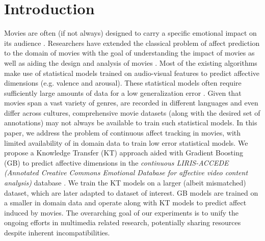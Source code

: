 \documentclass{article}
\begin{document}
\section{Introduction}
\label{sec:intro}
Movies are often (if not always) designed to carry a specific emotional impact on its audience \cite{bartsch2012emotional, canini2009emotional}.
Researchers have extended the classical problem of affect prediction to the domain of movies with the goal of understanding the impact of movies as well as aiding the design and analysis of movies \cite{giannakopoulos2009dimensional, jiang2014predicting}. 
Most of the existing algorithms make use of statistical models trained on audio-visual features to predict affective dimensions (e.g. valence and arousal).  
These statistical models often require sufficiently large amounts of data for a low generalization error \cite{vapnik1998statistical}.
Given that movies span a vast variety of genres, are recorded in different languages and even differ across cultures, comprehensive movie datasets (along with the desired set of annotations) may not always be available to train such statistical models. 
In this paper, we address the problem of continuous affect tracking in movies, with limited availability of in domain data to train low error statistical models. 
We propose a Knowledge Transfer (KT) approach aided with Gradient Boosting (GB) to predict affective dimensions in the {\it continuous LIRIS-ACCEDE (Annotated Creative Commons Emotional Database for affective video content analysis)} database \cite{baveye2015liris}.
We train the KT models on a larger (albeit mismatched) dataset, which are later adapted to dataset of interest. 
GB models are trained on a smaller in domain data and operate along with KT models to predict affect induced by movies.
The overarching goal of our experiments is to unify the ongoing efforts in multimedia related research, potentially sharing resources despite inherent incompatibilities. 
\end{document}
